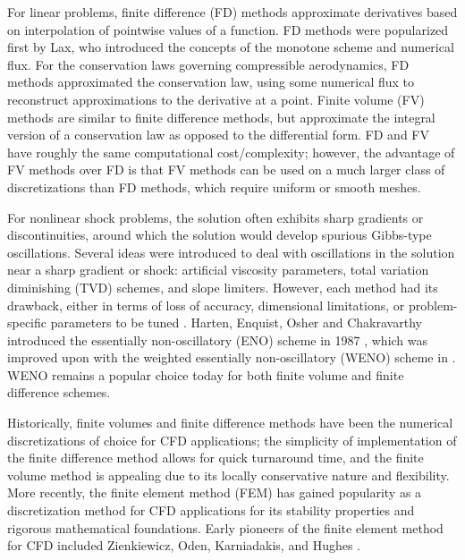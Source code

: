 For linear problems, finite difference (FD) methods approximate derivatives based on interpolation of pointwise values of a function.  FD methods were popularized first by Lax, who introduced the concepts of the monotone scheme and numerical flux. For the conservation laws governing compressible aerodynamics, FD methods approximated the conservation law, using some numerical flux to reconstruct approximations to the derivative at a point. Finite volume (FV) methods are similar to finite difference methods, but approximate the integral version of a conservation law as opposed to the differential form. FD and FV have roughly the same computational cost/complexity; however, the advantage of FV methods over FD is that FV methods can be used on a much larger class of discretizations than FD methods, which require uniform or smooth meshes. 

For nonlinear shock problems, the solution often exhibits sharp gradients or discontinuities, around which the solution would develop spurious Gibbs-type oscillations. Several ideas were introduced to deal with oscillations in the solution near a sharp gradient or shock: artificial viscosity parameters, total variation diminishing (TVD) schemes, and slope limiters. However, each method had its drawback, either in terms of loss of accuracy, dimensional limitations, or problem-specific parameters to be tuned \cite{Shu:Lectures}. Harten, Enquist, Osher and Chakravarthy introduced the essentially non-oscillatory (ENO) scheme in 1987 \cite{ENO}, which was improved upon with the weighted essentially non-oscillatory (WENO) scheme in \cite{WENO}. WENO remains a popular choice today for both finite volume and finite difference schemes. 

Historically, finite volumes and finite difference methods have been the numerical discretizations of choice for CFD applications; the simplicity of implementation of the finite difference method allows for quick turnaround time, and the finite volume method is appealing due to its locally conservative nature and flexibility. More recently, the finite element method (FEM) has gained popularity as a discretization method for CFD applications for its stability properties and rigorous mathematical foundations. Early pioneers of the finite element method for CFD included Zienkiewicz, Oden, Karniadakis, and Hughes \cite{ChungCFDBook}.


